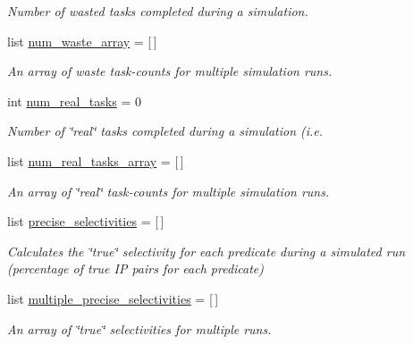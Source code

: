 \begin{DoxyCompactItemize}
\begin{DoxyCompactList}\small\item\em Number of wasted tasks completed during a simulation. \end{DoxyCompactList}\item 
list \mbox{\hyperlink{classdynamicfilterapp_1_1test__simulations_1_1_simulation_test_a828f23437ee523a85f868b2f4415ec6f}{num\+\_\+waste\+\_\+array}} = \mbox{[}$\,$\mbox{]}
\begin{DoxyCompactList}\small\item\em An array of waste task-\/counts for multiple simulation runs. \end{DoxyCompactList}\item 
int \mbox{\hyperlink{classdynamicfilterapp_1_1test__simulations_1_1_simulation_test_a61300ee4fb9cf4d5350f644139128cb6}{num\+\_\+real\+\_\+tasks}} = 0
\begin{DoxyCompactList}\small\item\em Number of \char`\"{}real\char`\"{} tasks completed during a simulation (i.\+e. \end{DoxyCompactList}\item 
list \mbox{\hyperlink{classdynamicfilterapp_1_1test__simulations_1_1_simulation_test_a3fb16b395d9b79d1978cac8a76b81ea6}{num\+\_\+real\+\_\+tasks\+\_\+array}} = \mbox{[}$\,$\mbox{]}
\begin{DoxyCompactList}\small\item\em An array of \char`\"{}real\char`\"{} task-\/counts for multiple simulation runs. \end{DoxyCompactList}\item 
list \mbox{\hyperlink{classdynamicfilterapp_1_1test__simulations_1_1_simulation_test_a8d53be86a7f2509e044464570fd8e640}{precise\+\_\+selectivities}} = \mbox{[}$\,$\mbox{]}
\begin{DoxyCompactList}\small\item\em Calculates the \char`\"{}true\char`\"{} selectivity for each predicate during a simulated run (percentage of true IP pairs for each predicate) \end{DoxyCompactList}\item 
list \mbox{\hyperlink{classdynamicfilterapp_1_1test__simulations_1_1_simulation_test_a0a23d1f7f323366b1269cc0ad9e73fae}{multiple\+\_\+precise\+\_\+selectivities}} = \mbox{[}$\,$\mbox{]}
\begin{DoxyCompactList}\small\item\em An array of \char`\"{}true\char`\"{} selectivities for multiple runs. \end{DoxyCompactList}\item 

\end{DoxyCompactItemize}
